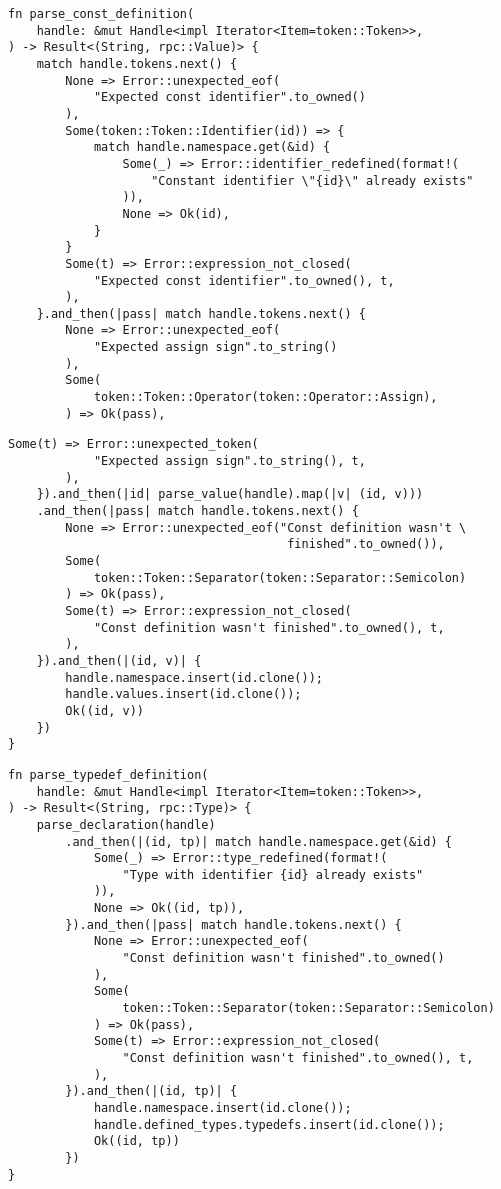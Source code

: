 \begin{lstlisting}[caption={Разбор константы (часть 1)}, label={lst:rust_parser_const1}]
fn parse_const_definition(
    handle: &mut Handle<impl Iterator<Item=token::Token>>,
) -> Result<(String, rpc::Value)> {
    match handle.tokens.next() {
        None => Error::unexpected_eof(
            "Expected const identifier".to_owned()
        ),
        Some(token::Token::Identifier(id)) => {
            match handle.namespace.get(&id) {
                Some(_) => Error::identifier_redefined(format!(
                    "Constant identifier \"{id}\" already exists"
                )),
                None => Ok(id),
            }
        }
        Some(t) => Error::expression_not_closed(
            "Expected const identifier".to_owned(), t,
        ),
    }.and_then(|pass| match handle.tokens.next() {
        None => Error::unexpected_eof(
            "Expected assign sign".to_string()
        ),
        Some(
            token::Token::Operator(token::Operator::Assign),
        ) => Ok(pass),
\end{lstlisting}
\clearpage
\begin{lstlisting}[caption={Разбор константы (часть 2)}, label={lst:rust_parser_const2}]
        Some(t) => Error::unexpected_token(
            "Expected assign sign".to_string(), t,
        ),
    }).and_then(|id| parse_value(handle).map(|v| (id, v)))
    .and_then(|pass| match handle.tokens.next() {
        None => Error::unexpected_eof("Const definition wasn't \
                                       finished".to_owned()),
        Some(
            token::Token::Separator(token::Separator::Semicolon)
        ) => Ok(pass),
        Some(t) => Error::expression_not_closed(
            "Const definition wasn't finished".to_owned(), t,
        ),
    }).and_then(|(id, v)| {
        handle.namespace.insert(id.clone());
        handle.values.insert(id.clone());
        Ok((id, v))
    })
}
\end{lstlisting}

\begin{lstlisting}[caption={Разбор typedef (часть 1)}, label={lst:rust_parser_typedef1}]
fn parse_typedef_definition(
    handle: &mut Handle<impl Iterator<Item=token::Token>>,
) -> Result<(String, rpc::Type)> {
    parse_declaration(handle)
        .and_then(|(id, tp)| match handle.namespace.get(&id) {
            Some(_) => Error::type_redefined(format!(
                "Type with identifier {id} already exists"
            )),
            None => Ok((id, tp)),
        }).and_then(|pass| match handle.tokens.next() {
            None => Error::unexpected_eof(
                "Const definition wasn't finished".to_owned()
            ),
            Some(
                token::Token::Separator(token::Separator::Semicolon)
            ) => Ok(pass),
            Some(t) => Error::expression_not_closed(
                "Const definition wasn't finished".to_owned(), t,
            ),
        }).and_then(|(id, tp)| {
            handle.namespace.insert(id.clone());
            handle.defined_types.typedefs.insert(id.clone());
            Ok((id, tp))
        })
}
\end{lstlisting}

